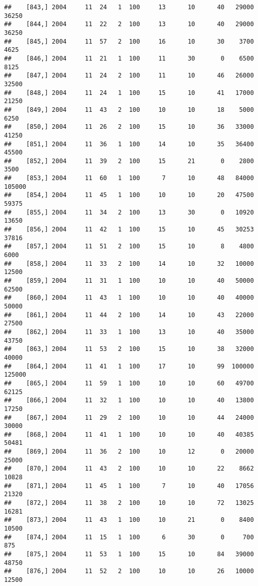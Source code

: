 \documentclass{article}\usepackage[]{graphicx}\usepackage[]{color}
\makeatletter
\newenvironment{kframe}{%
 \def\at@end@of@kframe{}%
 \ifinner\ifhmode%
  \def\at@end@of@kframe{\end{minipage}}%
  \begin{minipage}{\columnwidth}%
 \fi\fi%
 \def\FrameCommand##1{\hskip\@totalleftmargin \hskip-\fboxsep
 \colorbox{shadecolor}{##1}\hskip-\fboxsep
     \hskip-\linewidth \hskip-\@totalleftmargin \hskip\columnwidth}%
 \MakeFramed {\advance\hsize-\width
   \@totalleftmargin\z@ \linewidth\hsize
   \@setminipage}}%
 {\par\unskip\endMakeFramed%
 \at@end@of@kframe}
\newenvironment{knitrout}{}{} %
\makeatother
\begin{document}
\begin{knitrout}
\begin{kframe}
\begin{verbatim}
##    [843,] 2004     11  24   1  100     13      10      40   29000   36250
##    [844,] 2004     11  22   2  100     13      10      40   29000   36250
##    [845,] 2004     11  57   2  100     16      10      30    3700    4625
##    [846,] 2004     11  21   1  100     11      30       0    6500    8125
##    [847,] 2004     11  24   2  100     11      10      46   26000   32500
##    [848,] 2004     11  24   1  100     15      10      41   17000   21250
##    [849,] 2004     11  43   2  100     10      10      18    5000    6250
##    [850,] 2004     11  26   2  100     15      10      36   33000   41250
##    [851,] 2004     11  36   1  100     14      10      35   36400   45500
##    [852,] 2004     11  39   2  100     15      21       0    2800    3500
##    [853,] 2004     11  60   1  100      7      10      48   84000  105000
##    [854,] 2004     11  45   1  100     10      10      20   47500   59375
##    [855,] 2004     11  34   2  100     13      30       0   10920   13650
##    [856,] 2004     11  42   1  100     15      10      45   30253   37816
##    [857,] 2004     11  51   2  100     15      10       8    4800    6000
##    [858,] 2004     11  33   2  100     14      10      32   10000   12500
##    [859,] 2004     11  31   1  100     10      10      40   50000   62500
##    [860,] 2004     11  43   1  100     10      10      40   40000   50000
##    [861,] 2004     11  44   2  100     14      10      43   22000   27500
##    [862,] 2004     11  33   1  100     13      10      40   35000   43750
##    [863,] 2004     11  53   2  100     15      10      38   32000   40000
##    [864,] 2004     11  41   1  100     17      10      99  100000  125000
##    [865,] 2004     11  59   1  100     10      10      60   49700   62125
##    [866,] 2004     11  32   1  100     10      10      40   13800   17250
##    [867,] 2004     11  29   2  100     10      10      44   24000   30000
##    [868,] 2004     11  41   1  100     10      10      40   40385   50481
##    [869,] 2004     11  36   2  100     10      12       0   20000   25000
##    [870,] 2004     11  43   2  100     10      10      22    8662   10828
##    [871,] 2004     11  45   1  100      7      10      40   17056   21320
##    [872,] 2004     11  38   2  100     10      10      72   13025   16281
##    [873,] 2004     11  43   1  100     10      21       0    8400   10500
##    [874,] 2004     11  15   1  100      6      30       0     700     875
##    [875,] 2004     11  53   1  100     15      10      84   39000   48750
##    [876,] 2004     11  52   2  100     10      10      26   10000   12500

\end{verbatim}
\end{kframe}
\end{knitrout}
\end{document}
